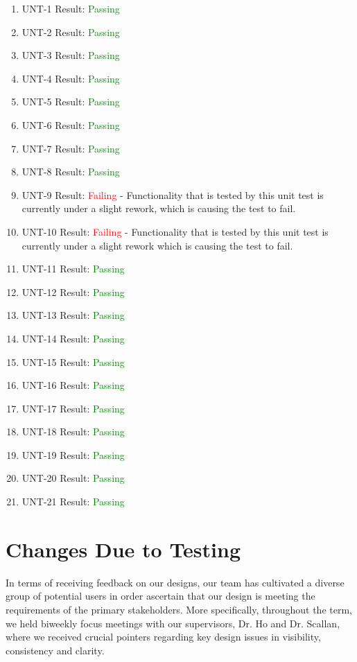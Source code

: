 \documentclass[12pt, titlepage]{article}
\begin{document}
\begin{enumerate}
  \item UNT-1
  Result: \textcolor{green}{Passing} 
  \item UNT-2
  Result: \textcolor{green}{Passing}
  \item UNT-3
  Result: \textcolor{green}{Passing}
  \item UNT-4
  Result: \textcolor{green}{Passing} 
  \item UNT-5
  Result: \textcolor{green}{Passing}
  \item UNT-6
  Result: \textcolor{green}{Passing} 
  \item UNT-7
  Result: \textcolor{green}{Passing}
  \item UNT-8
  Result: \textcolor{green}{Passing}
  \item UNT-9
  Result: \textcolor{red}{Failing} - Functionality that is tested by this unit test is currently under a slight rework, which is causing the test to fail.
  \item UNT-10
  Result: \textcolor{red}{Failing} - Functionality that is tested by this unit test is currently under a slight rework which is causing the test to fail.
  \item UNT-11
  Result: \textcolor{green}{Passing}
  \item UNT-12
  Result: \textcolor{green}{Passing} 
  \item UNT-13
  Result: \textcolor{green}{Passing}
  \item UNT-14
  Result: \textcolor{green}{Passing}
  \item UNT-15
  Result: \textcolor{green}{Passing} 
  \item UNT-16
  Result: \textcolor{green}{Passing}
  \item UNT-17
  Result: \textcolor{green}{Passing}
  \item UNT-18
  Result: \textcolor{green}{Passing} 
  \item UNT-19
  Result: \textcolor{green}{Passing}
  \item UNT-20
  Result: \textcolor{green}{Passing}
  \item UNT-21
  Result: \textcolor{green}{Passing}
\end{enumerate}

\section{Changes Due to Testing}

In terms of receiving feedback on our designs, our team has cultivated a diverse group of potential users 
in order ascertain that our design is meeting the requirements of the primary stakeholders. 
More specifically, throughout the term, 
we held biweekly focus meetings with our supervisors, Dr. Ho and Dr. Scallan, where we received crucial 
pointers regarding key design issues in visibility, consistency and clarity. \newline
\end{document}

